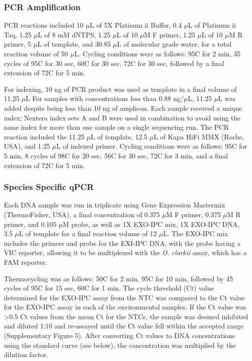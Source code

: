 \documentclass[
]{article}
\begin{document}
\hypertarget{pcr-amplification}{%
\subsubsection{PCR Amplification}\label{pcr-amplification}}

PCR reactions included 10 \(\mu\)L of 5X Platinum ii Buffer, 0.4
\(\mu\)L of Platinum ii Taq, 1.25 \(\mu\)L of 8 mM dNTPS, 1.25 \(\mu\)L
of 10 \(\mu\)M F primer, 1.25 \(\mu\)L of 10 \(\mu\)M R primer, 5
\(\mu\)L of template, and 30.85 \(\mu\)L of molecular grade water, for a
total reaction volume of 50 \(\mu\)L. Cycling conditions were as
follows: 95\degree C for 2 min, 35 cycles of 95\degree C for 30 sec,
60\degree C for 30 sec, 72\degree C for 30 sec, followed by a final
extension of 72\degree C for 5 min.

For indexing, 10 ng of PCR product was used as template in a final
volume of 11.25 \(\mu\)L For samples with concentrations less than 0.88
ng/\(\mu\)L, 11.25 \(\mu\)L was added despite being less than 10 ng of
amplicon. Each sample received a unique index; Nextera index sets A and
B were used in combination to avoid using the same index for more than
one sample on a single sequencing run. The PCR reaction included the
11.25 \(\mu\)L of template, 12.5 \(\mu\)L of Kapa HiFi MMX (Roche, USA),
and 1.25 \(\mu\)L of indexed primer. Cycling conditions were as follows:
95\degree C for 5 min, 8 cycles of 98\degree C for 20 sec, 56\degree C
for 30 sec, 72\degree C for 3 min, and a final extension of 72\degree C
for 5 min.

\hypertarget{species-specific-qpcr}{%
\subsubsection{Species Specific qPCR}\label{species-specific-qpcr}}

Each DNA sample was run in triplicate using Gene Expression Mastermix
(ThermoFisher, USA), a final concentration of 0.375 \(\mu\)M F primer,
0.375 \(\mu\)M R primer, and 0.105 \(\mu\)M probe, as well as 1X EXO-IPC
mix, 1X EXO-IPC DNA, 3.5 \(\mu\)L of template for a final reaction
volume of 12 \(\mu\)L. The EXO-IPC mix includes the primers and probe
for the EXI-IPC DNA, with the probe having a VIC reporter, allowing it
to be multiplexed with the \emph{O. clarkii} assay, which has a FAM
reporter.

Thermocycling was as follows: 50\degree C for 2 min, 95\degree C for 10
min, followed by 45 cycles of 95\degree C for 15 sec, 60\degree C for 1
min. The cycle threshold (Ct) value determined for the EXO-IPC assay
from the NTC was compared to the Ct value for the EXO-IPC assay in each
of the environmental samples. If the Ct value was \textgreater0.5 Ct
values from the mean Ct for the NTCs, the sample was deemed inhibited
and diluted 1:10 and re-assayed until the Ct value fell within the
accepted range (Supplementary Figure 5). After converting Ct values to
DNA concentrations using the standard curve (see below), the
concentration was multiplied by the dilution factor.
\end{document}
